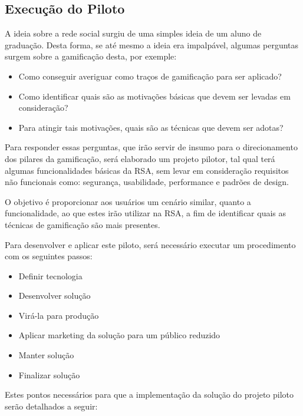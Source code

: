 \subsection{Execução do Piloto}
\label{sub:execu_o_do_piloto}
A ideia sobre a rede social surgiu de uma simples ideia de um aluno de graduação. Desta forma, se até mesmo a
ideia era impalpável, algumas perguntas surgem sobre a gamificação desta, por exemple:

\begin{itemize}
    \item Como conseguir averiguar como traços de gamificação para ser aplicado?
    \item Como identificar quais são as motivações básicas que devem ser levadas em consideração?
    \item Para atingir tais motivações, quais são as técnicas que devem ser adotas?
\end{itemize}

Para responder essas perguntas, que irão servir de insumo para o direcionamento dos pilares da gamificação, será elaborado um projeto pilotor, tal qual terá algumas funcionalidades básicas da RSA, sem levar em consideração requisitos não funcionais como: segurança, usabilidade, performance e padrões de design.

O objetivo é proporcionar aos usuários um cenário similar, quanto a funcionalidade, ao que estes irão utilizar
na RSA, a fim de identificar quais as técnicas de gamificação são mais presentes.

Para desenvolver e aplicar este piloto, será necessário executar um procedimento com os seguintes passos:

\begin{itemize}
    \item Definir tecnologia
    \item Desenvolver solução
    \item Virá-la para produção
    \item Aplicar marketing da solução para um público reduzido
    \item Manter solução
    \item Finalizar solução
\end{itemize}

Estes pontos necessários para que a implementação da solução do projeto piloto serão detalhados a seguir:

